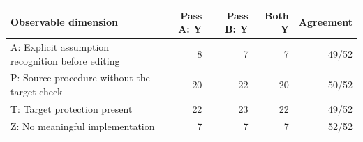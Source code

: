 \begin{tabular}{p{6.1cm}rrrr}
\toprule
Observable dimension & Pass A: Y & Pass B: Y & Both Y & Agreement\\
\midrule
A: Explicit assumption recognition before editing & 8 & 7 & 7 & 49/52\\
P: Source procedure without the target check & 20 & 22 & 20 & 50/52\\
T: Target protection present & 22 & 23 & 22 & 49/52\\
Z: No meaningful implementation & 7 & 7 & 7 & 52/52\\
\bottomrule
\end{tabular}
